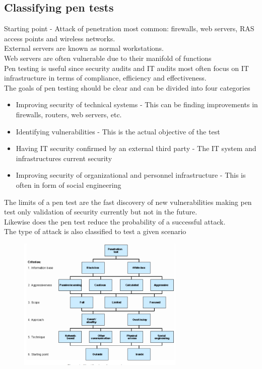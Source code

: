 \documentclass[12pt, a4paper]{article}
\begin{document}
		\subsection{Classifying pen tests}
			Starting point - Attack of penetration most common: firewalls, web servers, RAS access points and wireless networks.\\
			External servers are known as normal workstations.\\
			Web servers are often vulnerable due to their manifold of functions\\
			Pen testing is useful since security audits and IT audits most often focus on IT infrastructure in terms of compliance, efficiency and effectiveness.\\
			The goals of pen testing should be clear and can be divided into four categories\\
			\begin{itemize}
				\item Improving security of technical systems - This can be finding improvements in firewalls, routers, web servers, etc.
				\item Identifying vulnerabilities - This is the actual objective of the test
				\item Having IT security confirmed by an external third party - The IT system and infrastructures current security
				\item Improving security of organizational and personnel infrastructure - This is often in form of social engineering
			\end{itemize}
			The limits of a pen test are the fast discovery of new vulnerabilities making pen test only validation of security currently but not in the future.\\
			Likewise does the pen test reduce the probability of a successful attack.\\
			The type of attack is also classified to test a given scenario\\
			\begin{figure}[h!]
				\centering
				\includegraphics[width=300px]{assets/penClassification.png}
			\end{figure}
\end{document}
